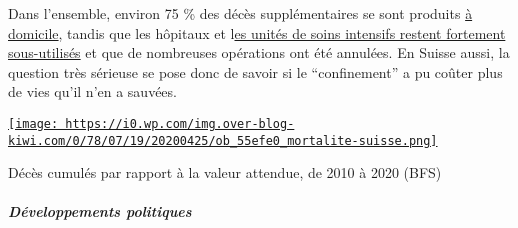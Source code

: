 Dans l'ensemble, environ 75 \% des décès supplémentaires se sont
produits
\href{https://www.tagesspiegel.de/wissen/woran-sterben-corona-patienten-wirklich-ein-schweizer-forscher-macht-hoffnung-im-kampf-gegen-covid-19/25750666.html}{à
domicile}, tandis que les hôpitaux et
l\href{https://swprs.files.wordpress.com/2020/04/intensivbettenbelegung-schweiz-2020-04-14.png}{es
unités de soins intensifs restent fortement sous-utilisés} et que de
nombreuses opérations ont été annulées. En Suisse aussi, la question
très sérieuse se pose donc de savoir si le ``confinement'' a pu coûter
plus de vies qu'il n'en a sauvées.

\href{http://img.over-blog-kiwi.com/0/78/07/19/20200425/ob_55efe0_mortalite-suisse.png\#width=736\&height=357}{\texttt{[image: https://i0.wp.com/img.over-blog-kiwi.com/0/78/07/19/20200425/ob\_55efe0\_mortalite-suisse.png]}}

Décès cumulés par rapport à la valeur attendue, de 2010 à 2020 (BFS)

\hypertarget{duxe9veloppements-politiques-1}{%
\subparagraph{\texorpdfstring{\textbf{Développements
politiques}}{Développements politiques}}\label{duxe9veloppements-politiques-1}}

